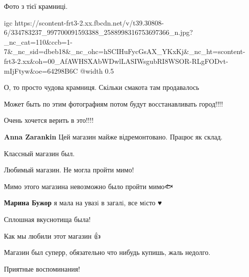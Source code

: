  
 
 
 
 

\qqSecCmt


Фото з тієї крамниці.

\ifcmt
  igc https://scontent-frt3-2.xx.fbcdn.net/v/t39.30808-6/334783237_997700091593388_2588998316753697366_n.jpg?_nc_cat=110&ccb=1-7&_nc_sid=dbeb18&_nc_ohc=hSCIHuFycGsAX_YKxKj&_nc_ht=scontent-frt3-2.xx&oh=00_AfAWHSXAbWDwlLASIWsgubRI8WSOR-RLgFODvt-mIjFtyw&oe=64298B6C
	@width 0.5
\fi


О, то просто чудова крамниця. Скільки смакота там продавалось🥰


Может быть по этим фотографиям потом будут восстанавливать город!!!!

Очень хочется верить в это!!!!

\begin{itemize} %
\textbf{Anna Zarankin} Цей магазин майже відремонтовано. Працює як склад.
\end{itemize} %


Классный магазин был.


Любимый магазин. Не могла пройти мимо!


Мимо этого магазина невозможно было пройти мимо🐟🦑🐠🐙

\textbf{Марина Бужор} я мала на увазi в загалi, все мiсто ♥️


Сплошная вкуснотища была!


Как мы любили этот магазин 👍


Магазин был суперр, обязательно что нибудь купишь, жаль недолго.


Приятные воспоминания!

